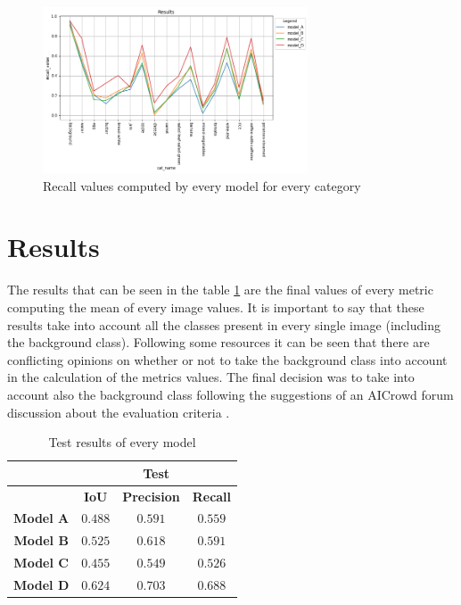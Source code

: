 \documentclass[a4paper,10pt]{report}
\begin{document}
\begin{figure}[h]
    \centering
    \includegraphics[width=0.7\textwidth]{assets/img/cat_recall.png}
    \caption{Recall values computed by every model for every category}
    \label{fig:cat_recall}
\end{figure}


\clearpage\section{Results}\label{sec:section-52}

The results that can be seen in the table \ref{table:test_results} are the final values of every metric computing the mean of every image values. It is important to say that these results take into account all the classes present in every single image (including the background class). Following some resources it can be seen that there are conflicting opinions on whether or not to take the background class into account in the calculation of the metrics values. The final decision was to take into account also the background class following the suggestions of an AICrowd forum discussion about the evaluation criteria \cite{evalcriteria}.

\begin{table}[h]
  \center
  \begin{tabular}{|c|c|c|c|}
  \hline
    \multirow{2}{*}{} & \multicolumn{3}{c|}{\textbf{Test}}  \\ \hline                   
                        & \textbf{IoU} & \textbf{Precision} & \textbf{Recall} \\ \hline
    \textbf{Model A}   & $0.488$ & $0.591$ & $0.559$  \\ \hline
    \textbf{Model B}      & $0.525$ & $0.618$ & $0.591$ \\ \hline
    \textbf{Model C}       & $0.455$ & $0.549$ & $0.526$  \\ \hline
    \textbf{Model D} & $0.624$ & $ 0.703$ & $0.688$  \\ \hline
  \end{tabular}
  \caption{Test results of every model}
  \label{table:test_results}
\end{table}
\end{document}
